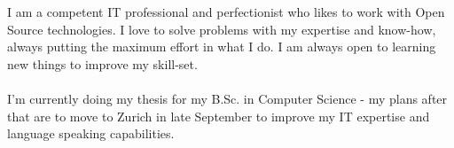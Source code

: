 I am a competent IT professional and perfectionist who likes to work with Open Source technologies.
I love to solve problems with my expertise and know-how, always putting the maximum effort in what I do.
I am always open to learning new things to improve my skill-set.\\
\\
I'm currently doing my thesis for my B.Sc. in Computer Science - my plans after that are
to move to Zurich in late September to improve my IT expertise and language speaking capabilities.